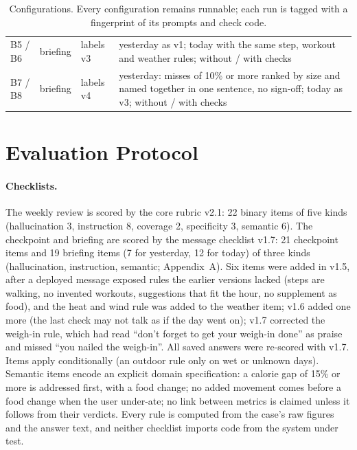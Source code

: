 \documentclass[10pt,twocolumn]{article}
\begin{document}
\begin{table}[t]
\begin{tabular}{@{}lllp{}@{}}
B5 / B6 & briefing & labels v3 & yesterday as v1; today with the same step, workout and weather rules; without / with checks\\
B7 / B8 & briefing & labels v4 & yesterday: misses of 10\% or more ranked by size and named together in one sentence, no sign-off; today as v3; without / with checks\\
\bottomrule
\end{tabular}
\caption{Configurations. Every configuration remains runnable; each run is tagged with a fingerprint of its prompts
and check code.}
\label{tab:attempts}
\end{table}

\section{Evaluation Protocol}
\label{sec:eval}

\paragraph{Checklists.} The weekly review is scored by the core rubric v2.1: 22 binary items of five kinds
(hallucination 3, instruction 8, coverage 2, specificity 3, semantic 6). The checkpoint and briefing are scored by
the message checklist v1.7: 21 checkpoint items and 19 briefing items (7 for yesterday, 12 for today) of three kinds
(hallucination, instruction, semantic; Appendix~A). Six items were added in v1.5, after a deployed message exposed rules
the earlier versions lacked (steps are walking, no invented workouts, suggestions that fit the hour, no supplement as
food), and the heat and wind rule was added to the weather item; v1.6 added one more (the last check may not talk as
if the day went on); v1.7 corrected the weigh-in rule, which had read ``don't forget to get your weigh-in done'' as
praise and missed ``you nailed the weigh-in''. All saved answers were re-scored with v1.7. Items
apply conditionally (an outdoor rule only on wet or unknown days). Semantic items encode an explicit domain
specification: a calorie gap of 15\% or more is addressed first, with a food change; no added movement comes before a
food change when the user under-ate; no link between metrics is claimed unless it follows from their verdicts. Every
rule is computed from the case's raw figures and the answer text, and neither checklist imports code from the system
under test.
\end{document}
